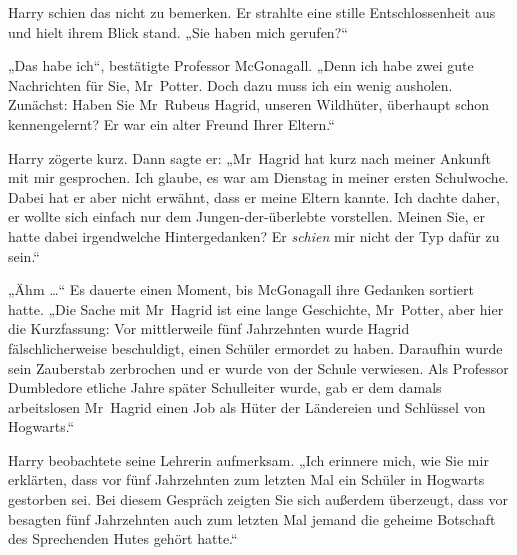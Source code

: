 Harry schien das nicht zu bemerken. Er strahlte eine stille Entschlossenheit aus und hielt ihrem Blick stand.
„Sie haben mich gerufen?“

„Das habe ich“, bestätigte Professor McGonagall.
„Denn ich habe zwei gute Nachrichten für Sie, Mr~Potter. Doch dazu muss ich ein wenig ausholen. Zunächst: Haben Sie Mr~Rubeus Hagrid, unseren Wildhüter, überhaupt schon kennengelernt? Er war ein alter Freund Ihrer Eltern.“

Harry zögerte kurz. Dann sagte er:
„Mr~Hagrid hat kurz nach meiner Ankunft mit mir gesprochen. Ich glaube, es war am Dienstag in meiner ersten Schulwoche. Dabei hat er aber nicht erwähnt, dass er meine Eltern kannte. Ich dachte daher, er wollte sich einfach nur dem Jungen-der-überlebte vorstellen. Meinen Sie, er hatte dabei irgendwelche Hintergedanken? Er \emph{schien} mir nicht der Typ dafür zu sein.“

„Ähm …“ Es dauerte einen Moment, bis McGonagall ihre Gedanken sortiert hatte.
„Die Sache mit Mr~Hagrid ist eine lange Geschichte, Mr~Potter, aber hier die Kurzfassung: Vor mittlerweile fünf Jahrzehnten wurde Hagrid fälschlicherweise beschuldigt, einen Schüler ermordet zu haben. Daraufhin wurde sein Zauberstab zerbrochen und er wurde von der Schule verwiesen. Als Professor Dumbledore etliche Jahre später Schulleiter wurde, gab er dem damals arbeitslosen Mr~Hagrid einen Job als Hüter der Ländereien und Schlüssel von Hogwarts.“

Harry beobachtete seine Lehrerin aufmerksam.
„Ich erinnere mich, wie Sie mir erklärten, dass vor fünf Jahrzehnten zum letzten Mal ein Schüler in Hogwarts gestorben sei. Bei diesem Gespräch zeigten Sie sich außerdem überzeugt, dass vor besagten fünf Jahrzehnten auch zum letzten Mal jemand die geheime Botschaft des Sprechenden Hutes gehört hatte.“

